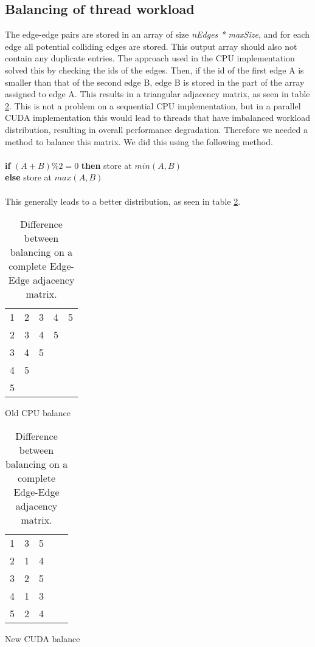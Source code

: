 \subsection{Balancing of thread workload}
The edge-edge pairs are stored in an array of size \textit{nEdges * maxSize}, and for each edge all potential colliding edges are stored. This output array should also not contain any duplicate entries. The approach used in the CPU implementation solved this by checking the ids of the edges. Then, if the id of the first edge A is smaller than that of the second edge B, edge B is stored in the part of the array assigned to edge A. This results in a triangular adjacency matrix, as seen in table \ref{table:balance}. This is not a problem on a sequential CPU implementation, but in a parallel CUDA implementation this would lead to threads that have imbalanced workload distribution, resulting in overall performance degradation. Therefore we needed a method to balance this matrix. We did this using the following method.\\
\\
\indent \indent \textbf{if} $(A + B) \% 2 = 0$ \textbf{then} store at $min(A,B)$\\
\indent \indent \textbf{else} store at $max(A,B)$ \\
\\
This generally leads to a better distribution, as seen in table \ref{table:balance}.

\begin{table}[!htb]
    	\begin{subtable}{.5\linewidth}
		\centering
		\begin{tabular}{ c || c | c | c | c }
			1 & 2 & 3 & 4 & 5 \\
			2 & 3 & 4 & 5 \\
			3 & 4 & 5 & \\
			4 & 5 & & \\
			5 & & &\\
		\end{tabular}
		\caption{Old CPU balance}
	\end{subtable}%
    	\begin{subtable}{.5\linewidth}
		\centering        
		\begin{tabular}{ c || c | c | c | c }
			1 & 3 & 5 &  &  \\
			2 & 1 & 4 &  &\\
			3 & 2 & 5 &  &\\
			4 & 1 & 3 &  &\\
			5 & 2 & 4 &  &\\
		\end{tabular}
		\caption{New CUDA balance}
	\end{subtable} 
	\caption{Difference between balancing on a complete Edge-Edge adjacency matrix.}
	\label{table:balance}
\end{table}
